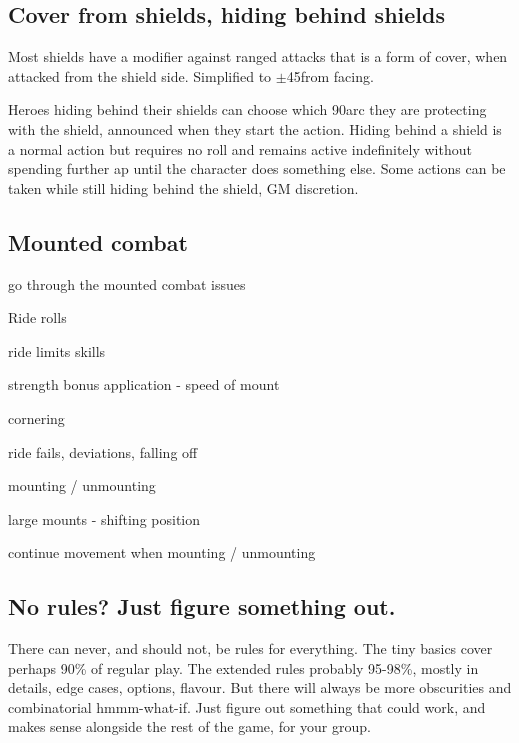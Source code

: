 \subsection*{Cover from shields, hiding behind shields}
Most shields have a modifier against ranged attacks that is a form of cover, when attacked from the shield side. Simplified to $\pm$45\degrees from facing.


Heroes hiding behind their shields can choose which 90\degrees arc they are protecting with the shield, announced when they start the action. Hiding behind a shield is a normal action but requires no roll and remains active indefinitely without spending further ap until the character does something else. Some actions can be taken while still hiding behind the shield, GM discretion.


\subsection*{Mounted combat}
\todo go through the mounted combat issues

Ride rolls

ride limits skills

strength bonus application - speed of mount

cornering

ride fails, deviations, falling off

mounting / unmounting

large mounts - shifting position

continue movement when mounting / unmounting







\subsection*{No rules? Just figure something out.}
There can never, and should not, be rules for everything. The tiny basics cover perhaps 90\% of regular play. The extended rules probably 95-98\%, mostly in details, edge cases, options, flavour. But there will always be more obscurities and combinatorial hmmm-what-if. Just figure out something that could work, and makes sense alongside the rest of the game, for your group.

